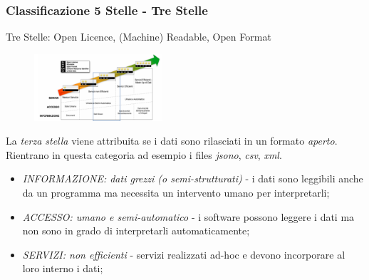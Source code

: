 \documentclass[8pt]{beamer}
\begin{document}
\begin{frame}
  \frametitle{Classificazione 5 Stelle - Tre Stelle}
  
  Tre Stelle: Open Licence, (Machine) Readable, Open Format

  \begin{figure}
     \includegraphics[width=180px]{stella3.png} 
  \end{figure}
  
  La \emph{terza stella} viene attribuita se i dati sono rilasciati in un formato \emph{aperto}.
  Rientrano in questa categoria ad esempio i files \emph{jsono}, \emph{csv}, \emph{xml}.
  \vspace{\baselineskip}

  \begin{itemize}
   \item \emph{INFORMAZIONE: dati grezzi (o semi-strutturati)} - i dati sono leggibili anche da un programma 
   ma necessita un intervento umano per interpretarli;
   \item \emph{ACCESSO: umano e semi-automatico} - i software possono leggere i dati ma non sono in grado di
   interpretarli automaticamente;
   \item \emph{SERVIZI: non efficienti} - servizi realizzati ad-hoc e devono incorporare al loro
  interno i dati;
  \end{itemize}
\end{frame}
\end{document}

